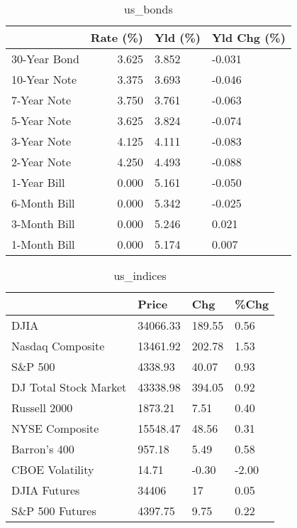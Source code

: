\documentclass{article}%
\begin{document}
\begin{table}[htbp]%
\caption{us\_bonds}%
\centering%
\begin{adjustbox}{width=1\textwidth}%
\begin{tabular}{lrll}
\toprule
             &  Rate (\%) & Yld (\%) & Yld Chg (\%) \\
\midrule
30-Year Bond &     3.625 &   3.852 &      -0.031 \\
10-Year Note &     3.375 &   3.693 &      -0.046 \\
 7-Year Note &     3.750 &   3.761 &      -0.063 \\
 5-Year Note &     3.625 &   3.824 &      -0.074 \\
 3-Year Note &     4.125 &   4.111 &      -0.083 \\
 2-Year Note &     4.250 &   4.493 &      -0.088 \\
 1-Year Bill &     0.000 &   5.161 &      -0.050 \\
6-Month Bill &     0.000 &   5.342 &      -0.025 \\
3-Month Bill &     0.000 &   5.246 &       0.021 \\
1-Month Bill &     0.000 &   5.174 &       0.007 \\
\bottomrule
\end{tabular}
%
\end{adjustbox}%
\end{table}

%


\begin{table}[htbp]%
\caption{us\_indices}%
\centering%
\begin{adjustbox}{width=1\textwidth}%
\begin{tabular}{llll}
\toprule
                      &    Price &    Chg &  \%Chg \\
\midrule
                 DJIA & 34066.33 & 189.55 &  0.56 \\
     Nasdaq Composite & 13461.92 & 202.78 &  1.53 \\
              S\&P 500 &  4338.93 &  40.07 &  0.93 \\
DJ Total Stock Market & 43338.98 & 394.05 &  0.92 \\
         Russell 2000 &  1873.21 &   7.51 &  0.40 \\
       NYSE Composite & 15548.47 &  48.56 &  0.31 \\
         Barron's 400 &   957.18 &   5.49 &  0.58 \\
      CBOE Volatility &    14.71 &  -0.30 & -2.00 \\
         DJIA Futures &    34406 &     17 &  0.05 \\
      S\&P 500 Futures &  4397.75 &   9.75 &  0.22 \\
\bottomrule
\end{tabular}
%
\end{adjustbox}%
\end{table}
\end{document}
